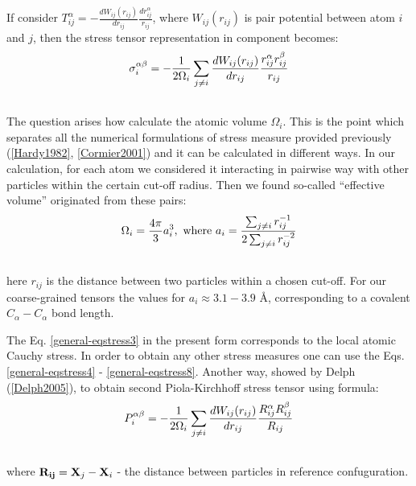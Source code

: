 \documentclass[letterpaper,10pt,english]{sphinxmanual}
\begin{document}
If consider $T_{ij}^{\alpha}=-\frac{dW_{ij}(r_{ij})}{dr_{ij}}\frac{dr_{ij}^{\alpha}}{r_{ij}}$, where $W_{ij}(r_{ij})$ is pair potential between atom $i$ and $j$, then the stress tensor representation in component becomes:
\label{general:equation-eqstress3}\begin{gather}
\begin{split}\sigma_{i}^{\alpha\beta} = -\frac{1}{2\Omega_{i}}\sum_{j \neq i}{\frac{dW_{ij}(r_{ij})}{dr_{ij}} \frac{r_{ij}^{\alpha}r_{ij}^{\beta}}{r_{ij}}}\end{split}\label{general-eqstress3}\\\begin{split}\end{split}\notag
\end{gather}
The question arises how calculate the atomic volume $\Omega_{i}$. This is the point which separates all the numerical formulations of stress measure provided previously ({\hyperref[general:hardy1982]{{[}Hardy1982{]}}}, {\hyperref[general:cormier2001]{{[}Cormier2001{]}}}) and it can be calculated in different ways. In our calculation, for each atom we considered it interacting in pairwise way with other particles within the certain cut-off radius. Then we found so-called ``effective volume'' originated from these pairs:
\begin{gather}
\begin{split}\Omega_{i} = \frac{4 \pi}{3}a_{i}^{3},~\text{where}~a_{i} = \frac{\sum_{j \neq i}{r_{ij}^{-1}}}{2 \sum_{j \neq i}{r_{ij}^{-2}}}\end{split}\notag\\\begin{split}\end{split}\notag
\end{gather}
here $r_{ij}$ is the distance between two particles within a chosen cut-off. For our coarse-grained tensors the values for $a_i \approx 3.1-3.9$ Å, corresponding to a covalent $C_\alpha-C_\alpha$ bond length.

The Eq. \eqref{general-eqstress3} in the present form corresponds to the local atomic Cauchy stress. In order to obtain any other stress measures one can use the Eqs. \eqref{general-eqstress4} - \eqref{general-eqstress8}. Another way, showed by Delph ({\hyperref[general:delph2005]{{[}Delph2005{]}}}), to obtain second Piola-Kirchhoff stress tensor using formula:
\begin{gather}
\begin{split}P_{i}^{\alpha\beta} = -\frac{1}{2\Omega_{i}}\sum_{j \neq i}{\frac{dW_{ij}(r_{ij})}{dr_{ij}} \frac{R_{ij}^{\alpha}R_{ij}^{\beta}}{R_{ij}}}\end{split}\notag\\\begin{split}\end{split}\notag
\end{gather}
where ${\bf R_{ij}}={\bf X}_j-{\bf X}_i$ - the distance between particles in reference confuguration.
\end{document}
